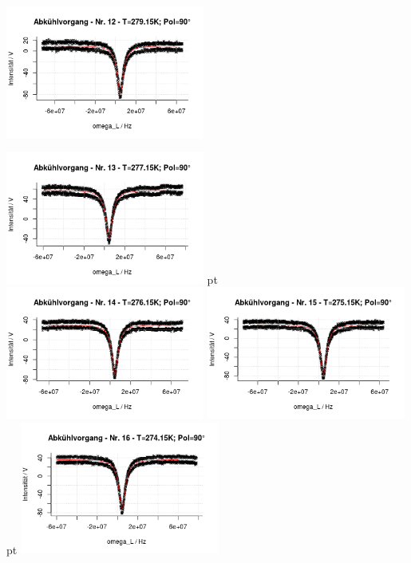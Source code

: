 \documentclass[12pt]{article}
\begin{document}
\begin{minipage}[h!]{\textwidth}
		\includegraphics[width=0.49\textwidth]{figures/cold90-12.png}\vskip -10pt
\end{minipage}
\begin{minipage}[h!]{\textwidth}
	\centering
		\includegraphics[width=0.49\textwidth]{figures/cold90-13.png} pt
		\includegraphics[width=0.49\textwidth]{figures/cold90-14.png}\vskip -10pt	\includegraphics[width=0.49\textwidth]{figures/cold90-15.png} pt
		\includegraphics[width=0.49\textwidth]{figures/cold90-16.png}\vskip -10pt

\end{minipage}
\end{document}
